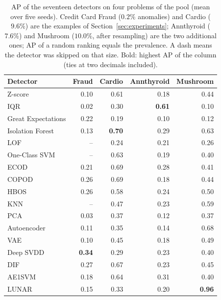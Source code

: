 \documentclass[conference]{IEEEtran}
\begin{document}
\begin{table}[t]
\caption{AP of the seventeen detectors on four problems of the pool (mean over five
seeds). Credit Card Fraud ($0.2\%$ anomalies) and Cardio ($9.6\%$) are the examples of
Section~\ref{sec:experiments}; Annthyroid ($7.6\%$) and Mushroom ($10.0\%$, after resampling) are the two additional ones; AP of a random ranking equals the prevalence. A dash
means the detector was skipped on that size. Bold: highest AP of the column (ties at two decimals included).}
\label{tab:examples}
\centering
\footnotesize
\setlength{\tabcolsep}{4pt}
\begin{tabular}{lrrrr}
\toprule
Detector & Fraud & Cardio & Annthyroid & Mushroom \\
\midrule
Z-score            & 0.10 & 0.61 & 0.18 & 0.44 \\
IQR                & 0.02 & 0.30 & \textbf{0.61} & 0.10 \\
Great Expectations & 0.22 & 0.19 & 0.10 & 0.12 \\
\midrule
Isolation Forest   & 0.13 & \textbf{0.70} & 0.29 & 0.63 \\
LOF                & -- & 0.24 & 0.21 & 0.26 \\
One-Class SVM      & -- & 0.63 & 0.19 & 0.40 \\
ECOD               & 0.21 & 0.69 & 0.28 & 0.41 \\
COPOD              & 0.26 & 0.69 & 0.18 & 0.44 \\
HBOS               & 0.26 & 0.58 & 0.24 & 0.50 \\
KNN                & -- & 0.47 & 0.23 & 0.59 \\
PCA                & 0.03 & 0.37 & 0.12 & 0.37 \\
\midrule
Autoencoder        & 0.11 & 0.35 & 0.14 & 0.68 \\
VAE                & 0.10 & 0.45 & 0.18 & 0.49 \\
Deep SVDD          & \textbf{0.34} & 0.29 & 0.23 & 0.40 \\
DIF                & 0.27 & 0.67 & 0.23 & 0.45 \\
AE1SVM             & 0.18 & 0.64 & 0.31 & 0.40 \\
LUNAR              & 0.15 & 0.33 & 0.20 & \textbf{0.96} \\
\bottomrule
\end{tabular}
\end{table}
\end{document}
